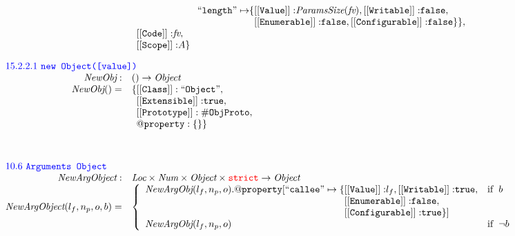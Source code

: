 \documentclass[a4paper, leqno]{amsart}
\def\inred{\color{red}}
\def\inblue{\color{blue}}
\newcommand{\strict}{{\inred\tt strict}}
\newcommand{\false}{{\tt false}}
\newcommand{\true}{{\tt true}}
\newcommand{\Loc}{\emph{Loc}}
\newcommand{\Obj}{\emph{Object}}
\newcommand{\Num}{\emph{Num}}
\newcommand{\hf}[1]{\emph{#1}}
\newcommand{\ifc}[1]{{\rm if}\begin{array}[t]{l}#1\end{array}}
\def\inred{\color{red}}
\def\inblue{\color{blue}}
\begin{document}
\[\begin{array}{rl}
& \phantom{\{ {\tt @property: \{ } }
 {\tt``length"\mapsto}\{{\tt [[Value]]:}\hf{ParamsSize}(\emph{fv}),%
 {\tt [[Writable]]:} \false,\\
& \phantom{\{{\tt @property: \{``length"\mapsto}\{}%
 {\tt [[Enumerable]]:} \false,
 {\tt [[Configurable]]:} \false\}\},\\
 
 
& \phantom{\{}{\tt [[Code]]:} \emph{fv},\\
& \phantom{\{}{\tt [[Scope]]:} {A}\}\\[1em]


\multicolumn{2}{l}{\mbox{\inblue 15.2.2.1 {\tt new Object([value])}}}\\
\hf{NewObj} :& () \rightarrow \Obj \\
\hf{NewObj}() =&
{\tt \{[[Class]]: ``Object"}, \\%
& \phantom{\{}
{\tt [[Extensible]]:} \true,\\
& \phantom{\{}{\tt [[Prototype]]: \#ObjProto}, \\
& \phantom{\{}{\tt @property: \{\}}\}\\
\\[2em]


\multicolumn{2}{l}{\mbox{\inblue 10.6 {\tt Arguments Object}}}\\
\hf{NewArgObject} :& \Loc \times \Num \times \Obj \times \strict \rightarrow \Obj \\
\hf{NewArgObject}(l_f, n_p, o, b) =&
\left\{\begin{array}{ll}
\hf{NewArgObj}(l_f, n_p, o).{\tt @property}[{\tt``callee"}\mapsto\{{\tt [[Value]]:}l_f,%
{\tt [[Writable]]:} \true, &\ifc{b}\\%
\phantom{\hf{NewArgObj}(l_f, n_p, o).{\tt @property}[{\tt``callee"}\mapsto\{}%
{\tt [[Enumerable]]:} \false,
&\\
\phantom{\hf{NewArgObj}(l_f, n_p, o).{\tt @property}[{\tt``callee"}\mapsto\{}%
{\tt [[Configurable]]:} \true
\}]&\\
\hf{NewArgObj}(l_f, n_p, o) &\ifc{\neg b}\\
\end{array}\right.
\\\\


\end{array}\]
\end{document}
